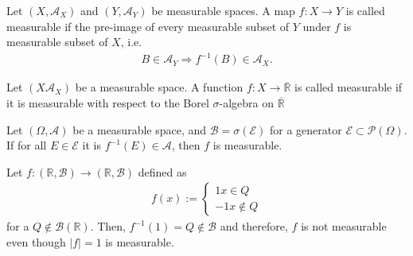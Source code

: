 \begin{definition}
    Let \((X, \mathcal{A}_X)\) and \((Y, \mathcal{A}_Y)\) be measurable spaces. A map \(f: X \rightarrow Y\) is called measurable if the pre-image of every measurable subset of \(Y\) under \(f\) is measurable subset of \(X\), i.e.
        \begin{align}
            B \in \mathcal{A}_Y \Rightarrow f^{-1}(B) \in \mathcal{A}_X \text{.}
        \end{align}
\end{definition}
%
%
%
%
%
\begin{definition}
    Let \((X \mathcal{A}_X)\) be a measurable space. A function \(f: X \rightarrow \overline{\mathbb{R}}\) is called measurable if it is measurable with respect to the Borel \(\sigma\)-algebra on \(\overline{\mathbb{R}}\)
\end{definition}
%
%
%
%
%
%
\begin{definition}
    
\end{definition}
%
%
%
%
%
\begin{theorem}
    Let \((\Omega, \mathcal{A})\) be a measurable space, and \(\mathcal{B} = \sigma(\mathcal{E})\) for a generator \(\mathcal{E} \subset \mathcal{P}(\Omega)\). If for all \(E \in \mathcal{E}\) it is \(f^{-1}(E) \in \mathcal{A}\), then \(f\) is measurable.
\end{theorem}
\begin{example}
    Let \(f:(\mathbb{R}, \mathcal{B}) \rightarrow (\mathbb{R}, \mathcal{B})\) defined as
    \begin{align}
        f(x) := \begin{cases}
            1 x \in Q \\
            -1 x \notin Q
        \end{cases}
    \end{align}
    for a \(Q \notin \mathcal{B}(\mathbb{R})\). Then, \(f^{-1}({1})=Q \notin \mathcal{B}\) and therefore, \(f\) is not measurable even though \(|f| = 1\) is measurable.
\end{example}